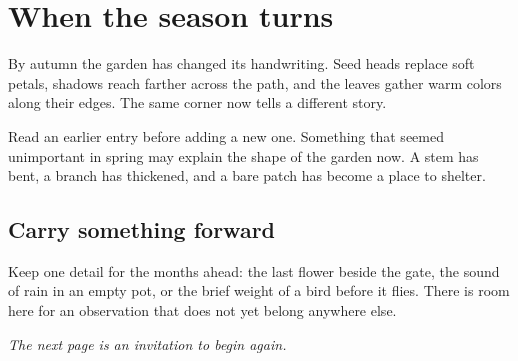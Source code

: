 \documentclass[11pt,a4paper,twoside]{article}
\begin{document}
\section*{When the season turns}
By autumn the garden has changed its handwriting. Seed heads replace soft
petals, shadows reach farther across the path, and the leaves gather warm
colors along their edges. The same corner now tells a different story.

Read an earlier entry before adding a new one. Something that seemed
unimportant in spring may explain the shape of the garden now. A stem has
bent, a branch has thickened, and a bare patch has become a place to shelter.

\subsection*{Carry something forward}
Keep one detail for the months ahead: the last flower beside the gate, the
sound of rain in an empty pot, or the brief weight of a bird before it flies.
There is room here for an observation that does not yet belong anywhere else.

\vspace{18mm}
{\small\itshape The next page is an invitation to begin again.}
\end{document}
